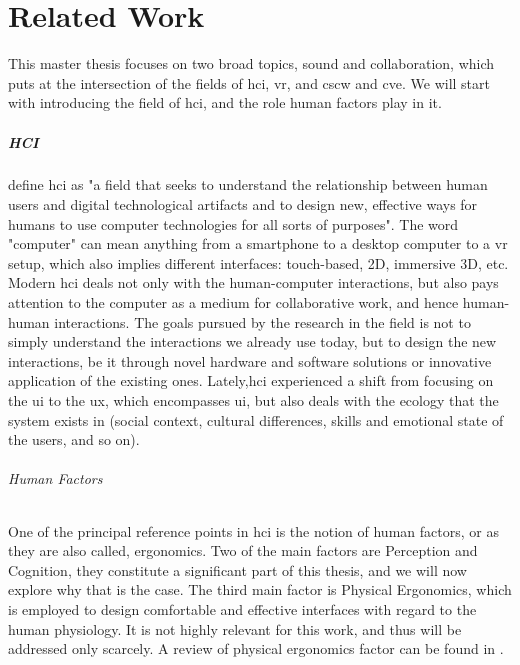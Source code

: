 
\chapter{Related Work}
This master thesis focuses on two broad topics, sound and collaboration, which puts at the intersection of the fields of \gls{hci}, \gls{vr}, and \gls{cscw} and \gls{cve}. We will start with introducing the field of \gls{hci}, and the role human factors play in it.

\paragraph{HCI}
\cite[Chapter~4.1.1]{jr_3d_2017} define \gls{hci} as "a field that seeks to understand the relationship between human users and digital technological artifacts and to design new, effective ways for humans to use computer technologies for all sorts of purposes". The word "computer" can mean anything from a smartphone to a desktop computer to a \gls{vr} setup, which also implies different interfaces: touch-based, 2D, immersive 3D, etc. Modern \gls{hci} deals not only with the human-computer interactions, but also pays attention to the computer as a medium for collaborative work, and hence human-human interactions. The goals pursued by the research in the field is not to simply understand the interactions we already use today, but to design the new interactions, be it through novel hardware and software solutions or innovative application of the existing ones. Lately,\gls{hci} experienced a shift from focusing on the \gls{ui} to the \gls{ux}, which encompasses \gls{ui}, but also deals with the ecology that the system exists in (social context, cultural differences, skills and emotional state of the users, and so on).

\subparagraph{Human Factors}
One of the principal reference points in \gls{hci} is the notion of human factors, or as they are also called, ergonomics. Two of the main factors are Perception and Cognition, they constitute a significant part of this thesis, and we will now explore why that is the case. The third main factor is Physical Ergonomics, which is employed to design comfortable and effective interfaces with regard to the human physiology. It is not highly relevant for this work, and thus will be addressed only scarcely. A review of physical ergonomics factor can be found in \cite[Chapter~3.5]{jr_3d_2017}.

